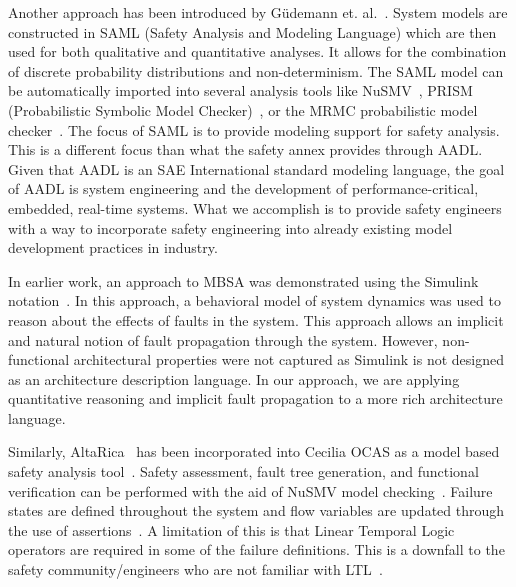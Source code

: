 Another approach has been introduced by G{\"u}demann et. al.~\cite{Gudemann:2010:FQQ:1909626.1909813}. System models are constructed in SAML (Safety Analysis and Modeling Language) which are then used for both qualitative and quantitative analyses. It allows for the combination of discrete probability distributions and non-determinism. The SAML model can be automatically imported into several analysis tools like NuSMV~\cite{Cimatti2000}, PRISM (Probabilistic Symbolic Model Checker)~\cite{CAV2011:KwNoPa}, or the MRMC probabilistic model checker~\cite{Katoen:2005:MRM:1114692.1115230}. The focus of SAML is to provide modeling support for safety analysis. This is a different focus than what the safety annex provides through AADL. Given that AADL is an SAE International standard modeling language, the goal of AADL is system engineering and the development of performance-critical, embedded, real-time systems. What we accomplish is to provide safety engineers with a way to incorporate safety engineering into already existing model development practices in industry. 

In earlier work, an approach to MBSA was demonstrated using the Simulink\textsuperscript{\textregistered} notation~\cite{Joshi05:SafeComp,Joshi05:Dasc}. In this approach, a behavioral model of system dynamics was used to reason about the effects of faults in the system. This approach allows an implicit and natural notion of fault propagation through the system. However, non-functional architectural properties were not captured as Simulink is not designed as an architecture description language. In our approach, we are applying quantitative reasoning and implicit fault propagation to a more rich architecture language.

Similarly, AltaRica~\cite{PROSVIRNOVA2013127} has been incorporated into Cecilia OCAS as a model based safety analysis tool~\cite{BieberERTS2018}. Safety assessment, fault tree generation, and functional verification can be performed with the aid of NuSMV model checking~\cite{symbAltaRica}. Failure states are defined throughout the system and flow variables are updated through the use of assertions~\cite{Bieber04safetyassessment}. A limitation of this is that Linear Temporal Logic operators are required in some of the failure definitions. This is a downfall to the safety community/engineers who are not familiar with LTL~\cite{Bieber04safetyassessment}. 

